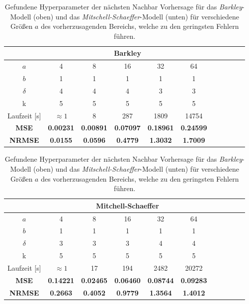\begin{table}[h]
	\centering

	\begin{tabular}{|c|c|c|c|c|c|c|c|c|c|c|}
		\multicolumn{1}{c|}{} & \multicolumn{5}{c|}{Barkley}\\ 
		\hline \hline 
		\rule[-1ex]{0pt}{2.5ex} $a$ & 4 & 8 & 16 & 32 & 64\\ 
		\hline 
		\rule[-1ex]{0pt}{2.5ex} $b$ & 1 & 1 & 1  & 1  & 1 \\ 
		\hline 
		\rule[-1ex]{0pt}{2.5ex} $\delta$ & 4 & 4 & 4 & 3 & 3 \\ 
		\hline 
		\rule[-1ex]{0pt}{2.5ex} k & 5 & 5 & 5 & 5 & 5 \\ 
		\hline 
		\rule[-1ex]{0pt}{2.5ex} Laufzeit [s] & $\approx 1$ & 8 & 287 & 1809 & 14754\\ 
		\hline 
		\rule[-1ex]{0pt}{2.5ex} \textbf{MSE} & \textbf{0.00231} & \textbf{0.00891} & \textbf{0.07097} & \textbf{0.18961} & \textbf{0.24599}\\ 
		\hline 
		\rule[-1ex]{0pt}{2.5ex} \textbf{NRMSE} & \textbf{0.0155} & \textbf{0.0596} & \textbf{0.4779} & \textbf{1.3032} & \textbf{1.7009} \\ 
		\hline 
	\end{tabular} 
	
	\vspace{0.75cm}

	\centering

	\begin{tabular}{|c|c|c|c|c|c|c|c|c|c|c|}
		\multicolumn{1}{c|}{} & \multicolumn{5}{c|}{Mitchell-Schaeffer} \\ 
		\hline \hline 
		\rule[-1ex]{0pt}{2.5ex} $a$ & 4 & 8 & 16 & 32 & 64 \\ 
		\hline 
		\rule[-1ex]{0pt}{2.5ex} $b$ & 1 & 1 & 1  & 1  & 1\\ 
		\hline 
		\rule[-1ex]{0pt}{2.5ex} $\delta$ & 3 & 3 & 3 & 4 & 4 \\ 
		\hline 
		\rule[-1ex]{0pt}{2.5ex} k & 5 & 5 & 5 & 5 & 5 \\ 
		\hline 
		\rule[-1ex]{0pt}{2.5ex} Laufzeit [s] & $\approx 1$ & 17 & 194 & 2482 & 20272\\ 
		\hline 
		\rule[-1ex]{0pt}{2.5ex} \textbf{MSE} & \textbf{0.14221} & \textbf{0.02465} & \textbf{0.06460} & \textbf{0.08744} & \textbf{0.09283} \\ 
		\hline 
		\rule[-1ex]{0pt}{2.5ex} \textbf{NRMSE} & \textbf{0.2663} & \textbf{0.4052} & \textbf{0.9779} & \textbf{1.3564} & \textbf{1.4012} \\ 
		\hline 
	\end{tabular} 

	\caption{Gefundene Hyperparameter der nächsten Nachbar Vorhersage für das \textit{Barkley}-Modell (oben) und das \textit{Mitschell-Schaeffer}-Modell (unten) für verschiedene Größen $a$ des vorherzusagenden Bereichs, welche zu den geringsten Fehlern führen.}
\label{tab:exp_inner_cross_nn_results}
\end{table}

